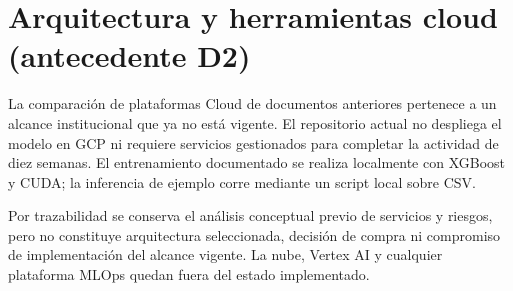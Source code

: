 \section{Arquitectura y herramientas cloud (antecedente D2)}

La comparación de plataformas Cloud de documentos anteriores pertenece a un alcance institucional que ya no está vigente. El repositorio actual no despliega el modelo en GCP ni requiere servicios gestionados para completar la actividad de diez semanas. El entrenamiento documentado se realiza localmente con XGBoost y CUDA; la inferencia de ejemplo corre mediante un script local sobre CSV.

Por trazabilidad se conserva el análisis conceptual previo de servicios y riesgos, pero no constituye arquitectura seleccionada, decisión de compra ni compromiso de implementación del alcance vigente. La nube, Vertex AI y cualquier plataforma MLOps quedan fuera del estado implementado.
